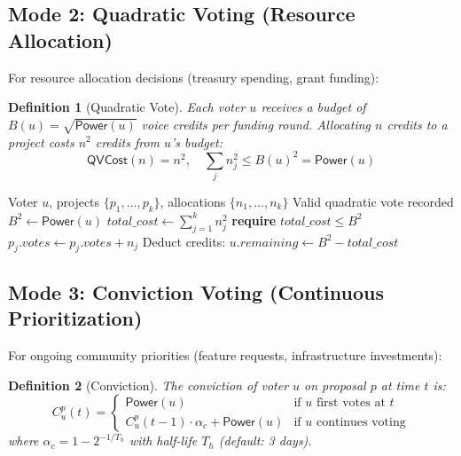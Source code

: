 \documentclass[11pt,a4paper]{article}
\newtheorem{definition}{Definition}
\begin{document}
\subsection{Mode 2: Quadratic Voting (Resource Allocation)}

For resource allocation decisions (treasury spending, grant funding):

\begin{definition}[Quadratic Vote]
Each voter $u$ receives a budget of $B(u) = \sqrt{\mathsf{Power}(u)}$ voice credits per funding round. Allocating $n$ credits to a project costs $n^2$ credits from $u$'s budget:
\begin{equation}
    \mathsf{QVCost}(n) = n^2, \quad \sum_j n_j^2 \leq B(u)^2 = \mathsf{Power}(u)
\end{equation}
\end{definition}

\begin{algorithm}[H]
\caption{Quadratic Vote Allocation}
\label{alg:qv}
\begin{algorithmic}[1]
\Require Voter $u$, projects $\{p_1, \ldots, p_k\}$, allocations $\{n_1, \ldots, n_k\}$
\Ensure Valid quadratic vote recorded
\State $B^2 \leftarrow \mathsf{Power}(u)$
\State $\mathit{total\_cost} \leftarrow \sum_{j=1}^{k} n_j^2$
\State \textbf{require} $\mathit{total\_cost} \leq B^2$
    \State $p_j.\mathit{votes} \leftarrow p_j.\mathit{votes} + n_j$
\EndFor
\State Deduct credits: $u.\mathit{remaining} \leftarrow B^2 - \mathit{total\_cost}$
\end{algorithmic}
\end{algorithm}

\subsection{Mode 3: Conviction Voting (Continuous Prioritization)}

For ongoing community priorities (feature requests, infrastructure investments):

\begin{definition}[Conviction]
The conviction of voter $u$ on proposal $p$ at time $t$ is:
\begin{equation}
    C_u^p(t) = \begin{cases}
        \mathsf{Power}(u) & \text{if } u \text{ first votes at } t \\
        C_u^p(t-1) \cdot \alpha_c + \mathsf{Power}(u) & \text{if } u \text{ continues voting}
    \end{cases}
\end{equation}
where $\alpha_c = 1 - 2^{-1/T_h}$ with half-life $T_h$ (default: 3 days).
\end{definition}
\end{document}
